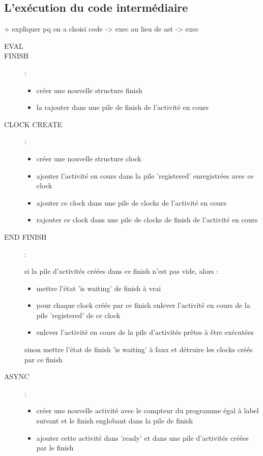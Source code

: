 \documentclass[12pt]{scrartcl}
\begin{document}
\newpage

\subsection{L'exécution du code intermédiaire}
+ expliquer pq on a choisi code -> exec au lieu de ast -> exec

\begin{description}
  \item[EVAL]

  \item[FINISH] : 
  \begin{itemize} 
    \item créer une nouvelle structure finish
    \item la rajouter dans une pile de finish de l'activité en cours
  \end{itemize} 

  \item[CLOCK CREATE] : 
    \begin{itemize} 
       \item créer une nouvelle structure clock
       \item ajouter l'activité en cours dans la pile 'registered' enregistrées avec ce clock
       \item ajouter ce clock dans une pile de clocks de l'activité en cours
       \item rajouter ce clock dans une pile de clocks de finish de l'activité en cours
    \end{itemize} 

  \item[END FINISH] : 
    
    si la pile d'activités créées dans ce finish n'est pas vide, alors : 
    \begin{itemize} 
      \item mettre l'état 'is waiting' de finish à vrai
      \item pour chaque clock créée par ce finish enlever l'activité en cours de la pile 'registered' de ce clock
      \item enlever l'activité en cours de la pile d'activités prêtes à être exécutées
    \end{itemize} 
    sinon mettre l'état de finish 'is waiting' à faux et détruire les clocks créés par ce finish

  \item[ASYNC] : 
    \begin{itemize} 
      \item créer une nouvelle activité avec le compteur du programme égal à label suivant et le finish englobant dans la pile de finish
      \item ajouter cette activité dans 'ready' et dans une pile d'activités créées par le finish
    \end{itemize} 
  

\end{description}
\end{document}
